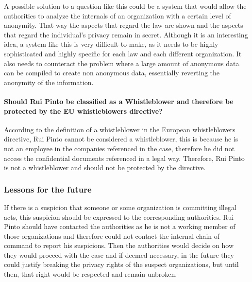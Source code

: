     A possible solution to a question like this could be a system that would allow the authorities to analyze the internals of an organization with a certain level of anonymity.
    That way the aspects that regard the law are shown and the aspects that regard the individual's privacy remain in secret.
    Although it is an interesting idea, a system like this is very difficult to make, as it needs to be highly sophisticated and highly specific for each law and each different organization.
    It also needs to counteract the problem where a large amount of anonymous data can be compiled to create non anonymous data, essentially reverting the anonymity of the information.
    
    
    
    \paragraph{Should Rui Pinto be classified as a Whistleblower and therefore be protected by the EU whistleblowers directive?}
    According to the definition of a whistleblower in the European whistleblowers directive, Rui Pinto cannot be considered a whistleblower, this is because he is not an employee in the companies referenced in the case, therefore he did not access the confidential documents referenced in a legal way.
    Therefore, Rui Pinto is not a whistleblower and should not be protected by the directive.

    \subsubsection{Lessons for the future}
    If there is a suspicion that someone or some organization is committing illegal acts, this suspicion should be expressed to the corresponding authorities.
    Rui Pinto should have contacted the authorities as he is not a working member of those organizations and therefore could not contact the internal chain of command to report his suspicions.
    Then the authorities would decide on how they would proceed with the case and if deemed necessary, in the future they could justify breaking the privacy rights of the suspect organizations, but until then, that right would be respected and remain unbroken.








